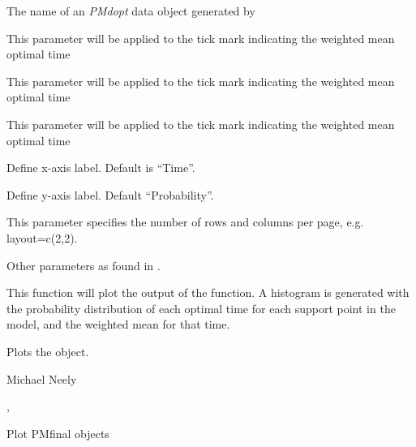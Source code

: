 \documentclass[a4paper]{book}
\begin{document}
\begin{Arguments}
\begin{ldescription}
\item[\code{x}] The name of an \emph{PMdopt} data object generated by 

\item[\code{col.mean}] This parameter will be applied to the tick mark indicating the weighted mean
optimal time

\item[\code{lwd.mean}] This parameter will be applied to the tick mark indicating the weighted mean
optimal time

\item[\code{ticksize.mean}] This parameter will be applied to the tick mark indicating the weighted mean
optimal time

\item[\code{xlab}] Define x-axis label.  Default is ``Time''.

\item[\code{ylab}] Define y-axis label.  Default ``Probability''.

\item[\code{layout}] This parameter specifies the number of rows and columns per page, e.g. layout=c(2,2).

\item[\code{...}] Other parameters as found in .
\end{ldescription}
\end{Arguments}
%
\begin{Details}\relax
This function will plot the output of the  function.  A histogram is generated
with the probability distribution of each optimal time for each support point in the model,
and the weighted mean for that time.
\end{Details}
%
\begin{Value}
Plots the object.
\end{Value}
%
\begin{Author}\relax
Michael Neely
\end{Author}
%
\begin{SeeAlso}\relax
{}, 
\end{SeeAlso}
%
\begin{Description}\relax
Plot PMfinal objects
\end{Description}
\end{document}
